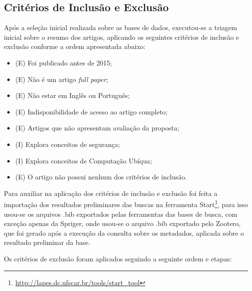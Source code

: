 \documentclass[ti,table]{texufpel} %
\begin{document}
\subsection{Critérios de Inclusão e Exclusão}
Após a seleção inicial realizada sobre as bases de dados, executou-se a triagem inicial sobre o resumo dos artigos, aplicando os seguintes critérios de inclusão e exclusão conforme a ordem apresentada abaixo: 
\begin{itemize}
	\item (E) Foi publicado antes de 2015;
	\item (E) Não é um artigo \textit{full paper};
	\item (E) Não estar em Inglês ou Português;
	\item (E) Indisponibilidade de acesso ao artigo completo;
	\item (E) Artigos que não apresentam avaliação da proposta;
	\item (I) Explora conceitos de segurança;
	\item (I) Explora conceitos de Computação Ubíqua;
	\item (E) O artigo não possui nenhum dos critérios de inclusão.
\end{itemize}

Para auxiliar na aplicação dos critérios de inclusão e exclusão foi feita a importação dos resultados preliminares das buscas na ferramenta Start\footnote{\url{http://lapes.dc.ufscar.br/tools/start_tool}},
para isso usou-se os arquivos .bib exportados pelas ferramentas das bases de busca, com exceção apenas da Spriger, onde usou-se o arquivo .bib exportado pelo Zootero, que foi gerado após a execução da consulta sobre os metadados, aplicada sobre o resultado preliminar da base.

Os critérios de exclusão foram aplicados seguindo a seguinte ordem e etapas:
\end{document}

